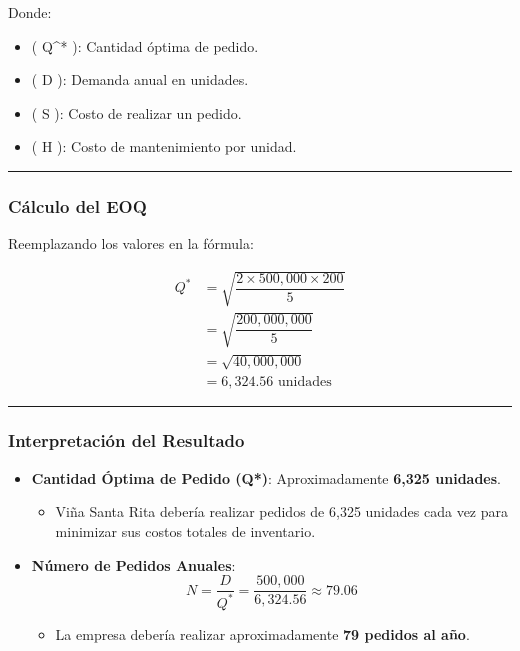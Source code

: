 \documentclass[
  letterpaper,
  DIV=11,
  numbers=noendperiod]{scrartcl}
\providecommand{\tightlist}{%
  \setlength{\itemsep}{0pt}\setlength{\parskip}{0pt}}\usepackage{longtable,booktabs,array}
\begin{document}
Donde:

\begin{itemize}
\tightlist
\item
  ( Q\^{}* ): Cantidad óptima de pedido.
\item
  ( D ): Demanda anual en unidades.
\item
  ( S ): Costo de realizar un pedido.
\item
  ( H ): Costo de mantenimiento por unidad.
\end{itemize}

\begin{center}\rule{0.5\linewidth}{0.5pt}\end{center}

\subsubsection{Cálculo del EOQ}\label{cuxe1lculo-del-eoq}

Reemplazando los valores en la fórmula:

\[
\begin{align*}
Q^* &= \sqrt{\dfrac{2 \times 500,000 \times 200}{5}} \\
&= \sqrt{\dfrac{200,000,000}{5}} \\
&= \sqrt{40,000,000} \\
&= 6,324.56 \text{ unidades}
\end{align*}
\]

\begin{center}\rule{0.5\linewidth}{0.5pt}\end{center}

\subsubsection{Interpretación del
Resultado}\label{interpretaciuxf3n-del-resultado}

\begin{itemize}
\tightlist
\item
  \textbf{Cantidad Óptima de Pedido (Q*)}: Aproximadamente \textbf{6,325
  unidades}.

  \begin{itemize}
  \tightlist
  \item
    Viña Santa Rita debería realizar pedidos de 6,325 unidades cada vez
    para minimizar sus costos totales de inventario.
  \end{itemize}
\item
  \textbf{Número de Pedidos Anuales}: \[
  N = \dfrac{D}{Q^*} = \dfrac{500,000}{6,324.56} \approx 79.06
  \]

  \begin{itemize}
  \tightlist
  \item
    La empresa debería realizar aproximadamente \textbf{79 pedidos al
    año}.
  \end{itemize}
\end{itemize}
\end{document}
